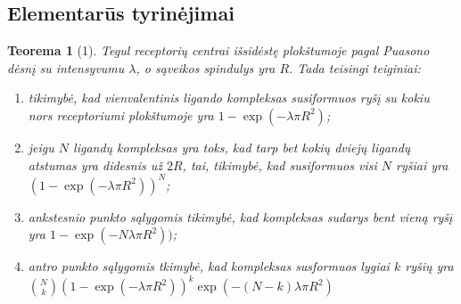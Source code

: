 \documentclass[10pt]{article}
\newtheorem{thm}{Teorema}
\begin{document}
\subsection{Elementarūs tyrinėjimai}

\begin{thm}[1]\label{thm:1}
Tegul receptorių centrai išsidėstę plokštumoje  pagal Puasono dėsnį su intensyvumu $\lambda$, o sąveikos spindulys yra $R$. Tada teisingi teiginiai:
\begin{enumerate}
	\item tikimybė, kad vienvalentinis ligando kompleksas susiformuos ryšį su kokiu nors receptoriumi plokštumoje yra $1-\exp(-\lambda \pi R^{2})$;
	\item jeigu $N$ ligandų kompleksas yra toks, kad tarp bet kokių dviejų ligandų atstumas  yra didesnis už $2R$, tai, tikimybė, kad susiformuos  visi $N$ ryšiai  yra $(1-\exp(-\lambda \pi R^{2}))^N$;
	\item ankstesnio punkto  sąlygomis  tikimybė, kad kompleksas  sudarys bent vieną ryšį yra 
	$1-\exp(-N \lambda \pi R^{2}))$;
	\item antro punkto sąlygomis tkimybė, kad kompleksas susformuos lygiai $k$ ryšių yra 
	 $ \binom{N}{k} \left( 1-\exp(-\lambda \pi R^{2}) \right) ^ k \exp(-(N-k) \lambda \pi R^{2})  $ 
	
	
	
\end{enumerate}

\end{thm}
\end{document}
